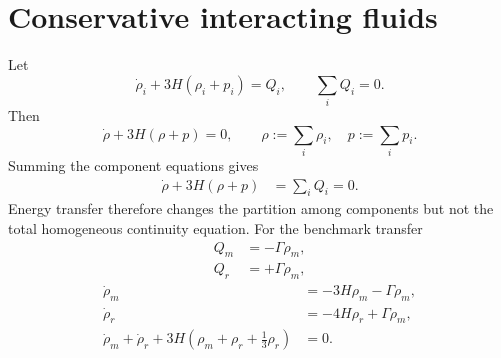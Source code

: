 \section{Conservative interacting fluids}
Let
\begin{equation}
\dot\rho_i+3H(\rho_i+p_i)=Q_i,
\qquad
\sum_iQ_i=0.
\end{equation}
Then
\begin{equation}
\boxed{
\dot\rho+3H(\rho+p)=0,
\qquad
\rho:=\sum_i\rho_i,
\quad
p:=\sum_i p_i.
}
\end{equation}
Summing the component equations gives
\begin{align}
\dot\rho+3H(\rho+p)
&=\sum_iQ_i
=0.
\end{align}
Energy transfer therefore changes the partition among components but not the total homogeneous continuity equation.
For the benchmark transfer
\begin{align}
Q_m&=-\Gamma\rho_m,\\
Q_r&=+\Gamma\rho_m,
\end{align}
\begin{align}
\dot\rho_m&=-3H\rho_m-\Gamma\rho_m,\\
\dot\rho_r&=-4H\rho_r+\Gamma\rho_m,\\
\dot\rho_m+\dot\rho_r
+3H\left(\rho_m+\rho_r+\frac13\rho_r\right)&=0.
\end{align}

